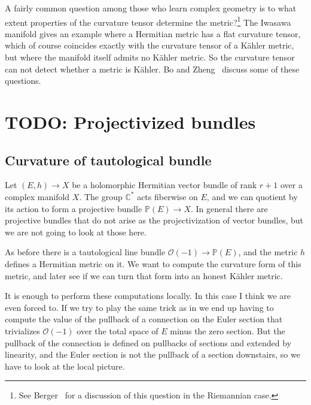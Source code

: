 \documentclass[11pt]{article}
\newcommand{\kk}[1]{\mathbb{#1}}
\newcommand{\cc}[1]{\mathcal{#1}}
\begin{document}
A fairly common question among those who learn complex geometry is to what extent properties of the curvature tensor determine the metric?\footnote{See Berger~\cite[Section~4.5]{berger} for a discussion of this question in the Riemannian case.} The Iwasawa manifold gives an example where a Hermitian metric has a flat curvature tensor, which of course coincides exactly with the curvature tensor of a K\"ahler metric, but where the manifold itself admits no K\"ahler metric. So the curvature tensor can not detect whether a metric is K\"ahler. Bo and Zheng~\cite{yang2016curvature} discuss some of these questions.



\section{TODO: Projectivized bundles}



\subsection{Curvature of tautological bundle}

Let $(E, h) \to X$ be a holomorphic Hermitian vector bundle of rank $r + 1$ over a complex manifold $X$. The group $\kk C^*$ acts fiberwise on $E$, and we can quotient by its action to form a projective bundle $\kk P(E) \to X$. In general there are projective bundles that do not arise as the projectivization of vector bundles, but we are not going to look at those here.

As before there is a tautological line bundle $\cc O(-1) \to \kk P(E)$, and the metric $h$ defines a Hermitian metric on it. We want to compute the curvature form of this metric, and later see if we can turn that form into an honest K\"ahler metric.

It is enough to perform these computations locally. In this case I think we are even forced to. If we try to play the same trick as in  we end up having to compute the value of the pullback of a connection on the Euler section that trivializes $\cc O(-1)$ over the total space of $E$ minus the zero section. But the pullback of the connection is defined on pullbacks of sections and extended by linearity, and the Euler section is not the pullback of a section downstairs, so we have to look at the local picture.
\end{document}
